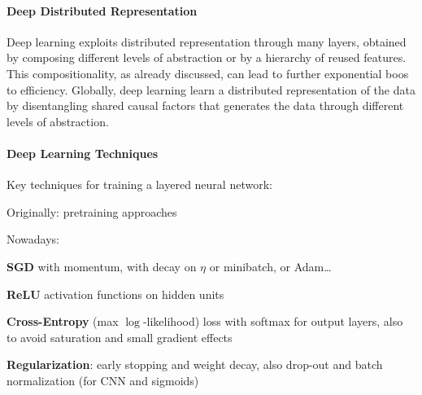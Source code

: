 \documentclass[10pt]{report}
\begin{document}
\paragraph{Deep Distributed Representation} Deep learning exploits distributed representation through many layers, obtained by composing different levels of abstraction or by a hierarchy of reused features. This compositionality, as already discussed, can lead to further exponential boos to efficiency. Globally, deep learning learn a distributed representation of the data by disentangling shared causal factors that generates the data through different levels of abstraction.
\paragraph{Deep Learning Techniques} Key techniques for training a layered neural network:
\begin{list}{}{}
	\item Originally: pretraining approaches
	\item Nowadays:
	\begin{list}{}{}
		\item \textbf{SGD} with momentum, with decay on $\eta$ or minibatch, or Adam\ldots
		\item \textbf{ReLU} activation functions on hidden units
		\item \textbf{Cross-Entropy} (max $\log$-likelihood) loss with softmax for output layers, also to avoid saturation and small gradient effects
		\item \textbf{Regularization}: early stopping and weight decay, also drop-out and batch normalization (for CNN and sigmoids)
	\end{list}
\end{list} 
\end{document}
